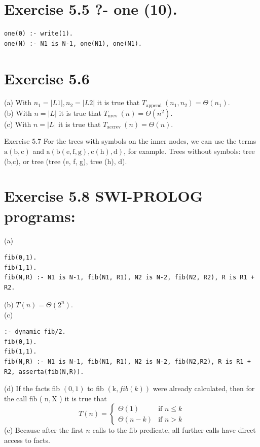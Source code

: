 \documentclass[10pt]{book}
\begin{document}
\section{Exercise 5.5 ?- one (10).}
\begin{verbatim}
one(0) :- write(1).
one(N) :- N1 is N-1, one(N1), one(N1).
\end{verbatim}

\section{Exercise 5.6}
(a) With $n_{1}=|L 1|, n_{2}=|L 2|$ it is true that $T_{\text {append }}\left(n_{1}, n_{2}\right)=\Theta\left(n_{1}\right)$.\\
(b) With $n=|L|$ it is true that $T_{\text {nrev }}(n)=\Theta\left(n^{2}\right)$.\\
(c) With $n=|L|$ it is true that $T_{\text {accrev }}(n)=\Theta(n)$.

Exercise 5.7 For the trees with symbols on the inner nodes, we can use the terms $\mathrm{a}(\mathrm{b}, \mathrm{c})$ and $\mathrm{a}(\mathrm{b}(\mathrm{e}, \mathrm{f}, \mathrm{g}), \mathrm{c}(\mathrm{h}), \mathrm{d})$, for example. Trees without symbols: tree (b,c), or tree (tree (e, f, g), tree (h), d).

\section{Exercise 5.8 SWI-PROLOG programs:}
(a)
\begin{verbatim}
fib(0,1).
fib(1,1).
fib(N,R) :- N1 is N-1, fib(N1, R1), N2 is N-2, fib(N2, R2), R is R1 + R2.
\end{verbatim}
(b) $T(n)=\Theta\left(2^{n}\right)$.\\
(c)
\begin{verbatim}
:- dynamic fib/2.
fib(0,1).
fib(1,1).
fib(N,R) :- N1 is N-1, fib(N1, R1), N2 is N-2, fib(N2,R2), R is R1 + R2, asserta(fib(N,R)).
\end{verbatim}
(d) If the facts fib $(0,1)$ to fib $(\mathrm{k}, f i b(k))$ were already calculated, then for the call fib ( $\mathrm{n}, \mathrm{X}$ ) it is true that
\[
T(n)=
\begin{cases}
\Theta(1) & \text{if } n \leq k \\
\Theta(n-k) & \text{if } n>k
\end{cases}
\]
(e) Because after the first $n$ calls to the fib predicate, all further calls have direct access to facts.
\end{document}
